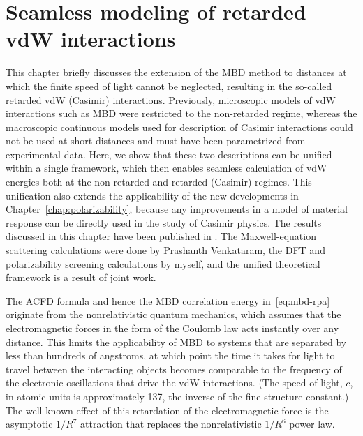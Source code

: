 \chapter{Seamless modeling of retarded vdW interactions}\label{chap:casimir}

{\sffamily{} This chapter briefly discusses the extension of the MBD method to distances at which the finite speed of light cannot be neglected, resulting in the so-called retarded vdW (Casimir) interactions.
Previously, microscopic models of vdW interactions such as MBD were restricted to the non-retarded regime, whereas the macroscopic continuous models used for description of Casimir interactions could not be used at short distances and must have been parametrized from experimental data.
Here, we show that these two descriptions can be unified within a single framework, which then enables seamless calculation of vdW energies both at the non-retarded and retarded (Casimir) regimes.
This unification also extends the applicability of the new developments in Chapter~\ref{chap:polarizability}, because any improvements in a model of material response can be directly used in the study of Casimir physics.
The results discussed in this chapter have been published in \citep*{VenkataramPRL17}.
The Maxwell-equation scattering calculations were done by Prashanth Venkataram, the DFT and polarizability screening calculations by myself, and the unified theoretical framework is a result of joint work.
}\vspace{1em}

The ACFD formula and hence the MBD correlation energy in~\eqref{eq:mbd-rpa} originate from the nonrelativistic quantum mechanics, which assumes that the electromagnetic forces in the form of the Coulomb law acts instantly over any distance.
This limits the applicability of MBD to systems that are separated by less than hundreds of angstroms, at which point the time it takes for light to travel between the interacting objects becomes comparable to the frequency of the electronic oscillations that drive the vdW interactions.
(The speed of light, $c$, in atomic units is approximately 137, the inverse of the fine-structure constant.)
The well-known effect of this retardation of the electromagnetic force is the asymptotic $1/R^7$ attraction that replaces the nonrelativistic $1/R^6$ power law.

